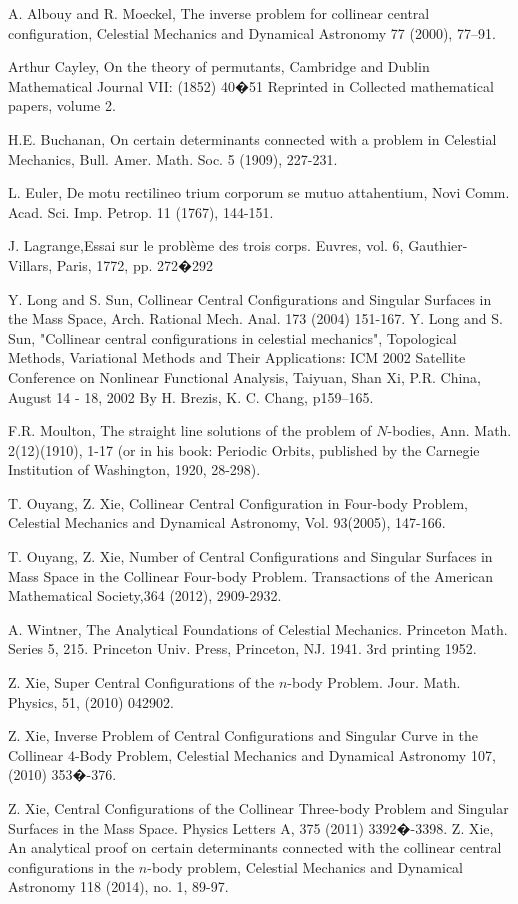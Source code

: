 \documentclass[11pt,leqno]{article}
\theoremstyle{definition}
\theoremstyle{remark}
\numberwithin{equation}{section}
\begin{document}
\begin{thebibliography}{00}

 A. Albouy and R. Moeckel, The inverse problem
for collinear central configuration, Celestial Mechanics and
Dynamical Astronomy 77 (2000), 77--91.

 Arthur Cayley, On the theory of permutants, Cambridge and Dublin Mathematical Journal VII:
(1852) 40�51 Reprinted in Collected mathematical papers, volume 2.


 H.E. Buchanan, On certain determinants connected with a problem in Celestial Mechanics, Bull. Amer. Math. Soc. 5 (1909), 227-231.

 L. Euler, De motu rectilineo trium corporum se mutuo attahentium, Novi Comm. Acad. Sci. Imp. Petrop. 11 (1767), 144-151.

 J. Lagrange,Essai sur le probl\`{e}me des trois corps. Euvres, vol. 6, Gauthier-
Villars, Paris, 1772, pp. 272�292 %

 Y. Long and S.  Sun, Collinear Central
Configurations and Singular Surfaces in the Mass Space, Arch.
Rational Mech. Anal. 173 (2004) 151-167.
 Y. Long and S.  Sun, "Collinear central
configurations in celestial mechanics", Topological Methods,
Variational Methods and Their Applications: ICM 2002 Satellite
Conference on Nonlinear Functional Analysis, Taiyuan, Shan Xi, P.R.
China, August 14 - 18, 2002 By H. Brezis, K. C. Chang, p159--165.

 F.R. Moulton, The straight line solutions of the
problem of $N$-bodies, Ann. Math. 2(12)(1910), 1-17 (or in his book:
Periodic Orbits, published by the Carnegie Institution of
Washington, 1920, 28-298).

 T. Ouyang, Z. Xie, Collinear Central Configuration in Four-body Problem,
 Celestial Mechanics and Dynamical Astronomy, Vol. 93(2005),
 147-166.

  T. Ouyang, Z. Xie, Number of Central Configurations and Singular Surfaces in
Mass Space
in the Collinear Four-body Problem. Transactions of the American Mathematical Society,364 (2012), 2909-2932.

 A. Wintner, The Analytical Foundations of Celestial Mechanics. Princeton
Math. Series 5, 215. Princeton Univ. Press, Princeton, NJ. 1941. 3rd
printing 1952.

  Z. Xie, Super Central Configurations of the $n$-body Problem.
 Jour. Math. Physics, 51, (2010) 042902.


 Z. Xie, Inverse Problem of Central Configurations and Singular Curve in the Collinear $4$-Body
  Problem,  Celestial Mechanics and Dynamical
Astronomy 107, (2010) 353�-376.

 Z. Xie, Central Configurations of the Collinear Three-body Problem and Singular Surfaces in the Mass Space. Physics Letters A, 375 (2011) 3392�-3398.
 Z. Xie, An analytical proof on certain determinants connected with the collinear central configurations in the $n$-body problem, Celestial Mechanics and Dynamical
Astronomy 118 (2014), no. 1, 89-97.
\end{thebibliography}
\end{document}
